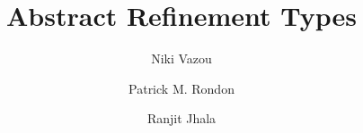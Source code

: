 \documentclass[runningheads,a4paper]{llncs}
\title{Abstract Refinement Types}
\author{
  Niki Vazou\inst{1} \and
  Patrick M. Rondon\inst{2} \and
  Ranjit Jhala\inst{1}
}
\institute{$^1$UC San Diego \quad $^2$Google}
\begin{document}
\maketitle

\begin{abstract}

\end{abstract}







{


}
\end{document}
